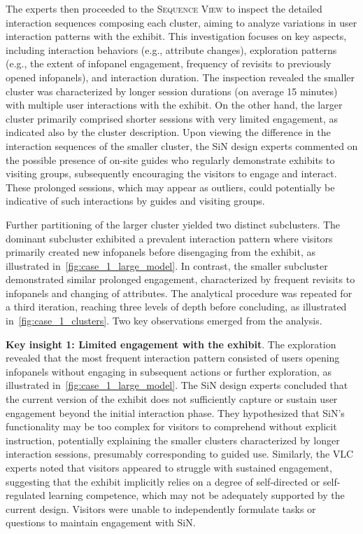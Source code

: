 \documentclass[preprint,journal]{vgtc}            %
\begin{document}
The experts then proceeded to the \textsc{Sequence View} to inspect the detailed interaction sequences composing each cluster, aiming to analyze variations in user interaction patterns with the exhibit.
This investigation focuses on key aspects, including interaction behaviors (e.g., attribute changes), exploration patterns (e.g., the extent of infopanel engagement, frequency of revisits to previously opened infopanels), and interaction duration.
The inspection revealed the smaller cluster was characterized by longer session durations (on average 15 minutes) with multiple user interactions with the exhibit.
On the other hand, the larger cluster primarily comprised shorter sessions with very limited engagement, as indicated also by the cluster description. 
Upon viewing the difference in the interaction sequences of the smaller cluster, the SiN design experts commented on the possible presence of on-site guides who regularly demonstrate exhibits to visiting groups, subsequently encouraging the visitors to engage and interact.
These prolonged sessions, which may appear as outliers, could potentially be indicative of such interactions by guides and visiting groups.

Further partitioning of the larger cluster yielded two distinct subclusters.
The dominant subcluster exhibited a prevalent interaction pattern where visitors primarily created new infopanels before disengaging from the exhibit, as illustrated in~\cref{fig:case_1_large_model}.
In contrast, the smaller subcluster demonstrated similar prolonged engagement, characterized by frequent revisits to infopanels and changing of attributes.
The analytical procedure was repeated for a third iteration, reaching three levels of depth before concluding, as illustrated in~\cref{fig:case_1_clusters}.
Two key observations emerged from the analysis.

\noindent 
\textbf{Key insight 1: Limited engagement with the exhibit}. 
The exploration revealed that the most frequent interaction pattern consisted of users opening infopanels without engaging in subsequent actions or further exploration, as illustrated in~\cref{fig:case_1_large_model}.
The SiN design experts concluded that the current version of the exhibit does not sufficiently capture or sustain user engagement beyond the initial interaction phase.
They hypothesized that SiN’s functionality may be too complex for visitors to comprehend without explicit instruction, potentially explaining the smaller clusters characterized by longer interaction sessions, presumably corresponding to guided use.
Similarly, the VLC experts noted that visitors appeared to struggle with sustained engagement, suggesting that the exhibit implicitly relies on a degree of self-directed or self-regulated learning competence, which may not be adequately supported by the current design.
Visitors were unable to independently formulate tasks or questions to maintain engagement with SiN.
\end{document}
